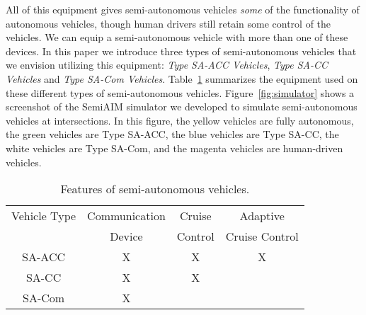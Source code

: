 All of this equipment gives semi-autonomous vehicles \emph{some} of
the functionality of autonomous vehicles, though human drivers still
retain some control of the vehicles.  We can equip a semi-autonomous
vehicle with more than one of these devices. In this paper we introduce three
types of semi-autonomous vehicles that we envision utilizing this
equipment: \textit{Type SA-ACC Vehicles}, \textit{Type SA-CC Vehicles}
and \textit{Type SA-Com Vehicles}.  Table~\ref{table:type} summarizes
the equipment used on these different types of semi-autonomous
vehicles.  Figure~\ref{fig:simulator} shows a screenshot of the
SemiAIM simulator we developed to simulate semi-autonomous vehicles at
intersections. In this figure, the yellow vehicles are fully
autonomous, the green vehicles are Type SA-ACC, the blue vehicles are
Type SA-CC, the white vehicles are Type SA-Com, and the magenta
vehicles are human-driven vehicles.



\begin{table}
\centering
\caption{Features of semi-autonomous vehicles.}
\label{table:type}
\small
\vspace{-.1in}
\begin{tabular}{|c|c|c|c|}
  \hline
  Vehicle Type & Communication & Cruise & Adaptive \\
               & Device & Control & Cruise Control \\
  \hline
  SA-ACC & X & X & X  \\
  SA-CC & X & X &  \\
  SA-Com & X & &  \\
  \hline
\end{tabular}
\vspace{-.3in}
\end{table}

